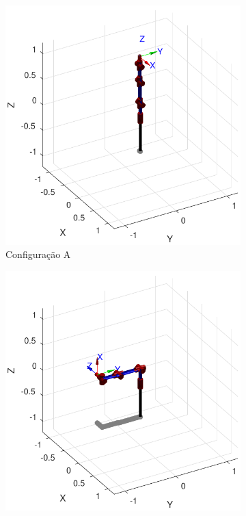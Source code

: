 \documentclass[a4paper,11pt]{article}
\theoremstyle{mytheor}
\begin{document}
\begin{figure}[!ht]
\centering
  \begin{minipage}{\linewidth}
  \centering
    \begin{subfigure}[b]{0.45\textwidth}
    \includegraphics[width=1\textwidth]{figs/ex4_a.pdf}
    \caption{Configuração A}
    \end{subfigure}
    \begin{subfigure}[b]{0.45\textwidth}
    \includegraphics[width=1\textwidth]{figs/ex4_b.pdf}

\end{subfigure}
\end{minipage}
\end{figure}
\end{document}
